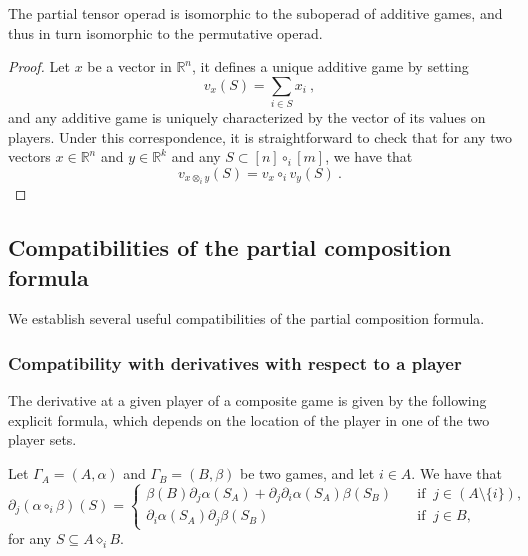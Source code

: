 \documentclass[a4paper,12pt]{amsart}
\begin{document}
\begin{proposition}
The partial tensor operad is isomorphic to the suboperad of additive games, and thus in turn isomorphic to the permutative operad. 
\end{proposition}

\begin{proof}
Let $x$ be a vector in $\mathbb{R}^n$, it defines a unique additive game by setting 
\[
v_x(S) = \sum_{i \in S} x_i~,
\]
and any additive game is uniquely characterized by the vector of its values on players. Under this correspondence, it is straightforward to check that for any two vectors \(x \in \mathbb{R}^n\) and \(y \in \mathbb{R}^k\) and any $S \subset [n] \circ_i [m]$, we have that
\[
v_{x \otimes_i y}(S) = v_x \circ_i v_y(S)~. 
\]
\end{proof}

\subsection{Compatibilities of the partial composition formula}
We establish several useful compatibilities of the partial composition formula.

\subsubsection{Compatibility with derivatives with respect to a player} The derivative at a given player of a composite game is given by the following explicit formula, which depends on the location of the player in one of the two player sets. 

\begin{lemma}\label{lemma: dérivée de la composée}
Let $\Gamma_A = (A, \alpha)$ and $\Gamma_B = (B, \beta)$ be two games, and let $i \in A$. We have that 
\[
\partial_j(\alpha \circ_i \beta)(S) = \begin{cases} 
    \beta(B)\partial_j\alpha(S_A) + \partial_j\partial_i\alpha(S_A)\beta(S_B) & \quad \text{if } \  j \in (A \setminus \{i\}), \\ 
    \partial_i\alpha(S_A)\partial_j\beta(S_B)& \quad \text{if } \  j \in B,
\end{cases}
\]
for any $S \subseteq A \diamond_i B$. 
\end{lemma}
\end{document}
